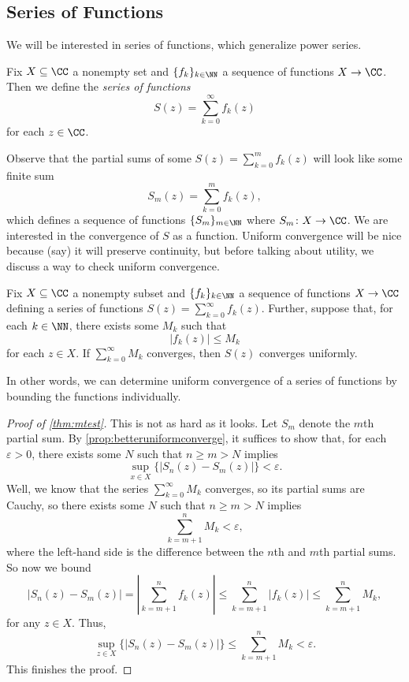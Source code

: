 \subsection{Series of Functions}
We will be interested in series of functions, which generalize power series.
\begin{definition}
	Fix $X\subseteq\CC$ a nonempty set and $\{f_k\}_{k\in\NN}$ a sequence of functions $X\to\CC$. Then we define the \textit{series of functions}
	\[S(z)=\sum_{k=0}^\infty f_k(z)\]
	for each $z\in\CC$.
\end{definition}
Observe that the partial sums of some $S(z)=\sum_{k=0}^mf_k(z)$ will look like some finite sum
\[S_m(z)=\sum_{k=0}^mf_k(z),\]
which defines a sequence of functions $\{S_m\}_{m\in\NN}$ where $S_m\colon X\to\CC$. We are interested in the convergence of $S$ as a function.
\convergedefi*
\noindent Uniform convergence will be nice because (say) it will preserve continuity, but before talking about utility, we discuss a way to check uniform convergence.
\begin{theorem} \label{thm:mtest}
	Fix $X\subseteq\CC$ a nonempty subset and $\{f_k\}_{k\in\NN}$ a sequence of functions $X\to\CC$ defining a series of functions $S(z)=\sum_{k=0}^\infty f_k(z)$. Further, suppose that, for each $k\in\NN$, there exists some $M_k$ such that
	\[|f_k(z)|\le M_k\]
	for each $z\in X$. If $\sum_{k=0}^\infty M_k$ converges, then $S(z)$ converges uniformly.
\end{theorem}
In other words, we can determine uniform convergence of a series of functions by bounding the functions individually.
\begin{proof}[Proof of \autoref{thm:mtest}]
	This is not as hard as it looks. Let $S_m$ denote the $m$th partial sum. By \autoref{prop:betteruniformconverge}, it suffices to show that, for each $\varepsilon>0$, there exists some $N$ such that $n\ge m>N$ implies
	\[\sup_{x\in X}\{|S_n(z)-S_m(z)|\}<\varepsilon.\]
	Well, we know that the series $\sum_{k=0}^\infty M_k$ converges, so its partial sums are Cauchy, so there exists some $N$ such that $n\ge m>N$ implies
	\[\sum_{k=m+1}^nM_k<\varepsilon,\]
	where the left-hand side is the difference between the $n$th and $m$th partial sums. So now we bound
	\[|S_n(z)-S_m(z)|=\left|\sum_{k=m+1}^nf_k(z)\right|\le\sum_{k=m+1}^n|f_k(z)|\le\sum_{k=m+1}^nM_k,\]
	for any $z\in X$. Thus,
	\[\sup_{z\in X}\{|S_n(z)-S_m(z)|\}\le\sum_{k=m+1}^nM_k<\varepsilon.\]
	This finishes the proof.
\end{proof}
